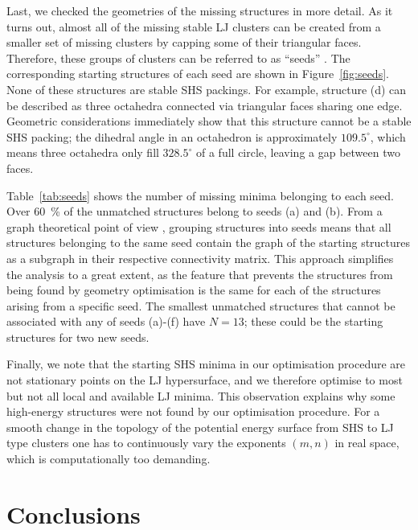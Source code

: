 Last, we checked the geometries of the missing structures in more detail.
As it turns out, almost all of the missing stable LJ clusters can be created
from a smaller set of missing clusters by capping some of their triangular
faces. Therefore, these groups of clusters can be referred to as ``seeds''
\autocite{Arkus_DerivingFiniteSphere_2011}. The corresponding starting structures of each seed
are shown in Figure~\ref{fig:seeds}. 
None of these structures are stable \ac{SHS} packings. For
example, structure (d) can be described as three octahedra connected via
triangular faces sharing one edge. Geometric considerations \autocite{Arkus_DerivingFiniteSphere_2011,Hoy_Structurefinitesphere_2012} immediately show
that this structure cannot be a stable \ac{SHS} packing;
the dihedral angle in an octahedron is approximately $109.5^\circ$, which means three
octahedra only fill $328.5^\circ$ of a full circle, leaving a gap between two
faces. 


Table~\ref{tab:seeds} shows the number of missing minima belonging to each seed.
Over 60~\% of the unmatched structures belong to seeds (a) and (b).  
From a graph theoretical point of view \autocite{Arkus_Minimalenergyclusters_2009,Arkus_DerivingFiniteSphere_2011},
grouping structures into seeds means that all structures belonging to the same
seed contain the graph of the starting structures as a subgraph in their
respective connectivity matrix.  This approach simplifies the analysis to a
great extent, as the feature that prevents the structures from being found by
geometry optimisation is the same for each of the structures arising from a
specific seed.  
The smallest unmatched structures that cannot be associated with any of seeds (a)-(f) have $N=13$;
these could be the starting structures for two new seeds.


Finally, we note that the starting \ac{SHS} minima in our optimisation procedure are
not stationary points on the LJ hypersurface, and we therefore optimise to most
but not all local and available LJ minima. This observation explains why some high-energy
structures were not found by our optimisation procedure. For a smooth change in the topology of the potential energy surface
from \ac{SHS} to LJ type clusters one has to continuously vary the exponents $(m,n)$
in real space, which is computationally too demanding.

\section{Conclusions}

